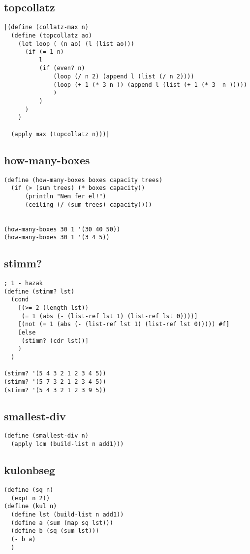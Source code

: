 \begin{multicols}{2}[]

\subsection{topcollatz}
\begin{lstlisting}
|(define (collatz-max n)
  (define (topcollatz ao)
    (let loop ( (n ao) (l (list ao)))
      (if (= 1 n)
          l
          (if (even? n)
              (loop (/ n 2) (append l (list (/ n 2))))
              (loop (+ 1 (* 3 n )) (append l (list (+ 1 (* 3  n )))))
              )
          )
      )
    )

  (apply max (topcollatz n)))|
\end{lstlisting}
\subsection{how-many-boxes}
\begin{lstlisting}
(define (how-many-boxes boxes capacity trees)
  (if (> (sum trees) (* boxes capacity))
      (println "Nem fer el!")
      (ceiling (/ (sum trees) capacity))))


(how-many-boxes 30 1 '(30 40 50))
(how-many-boxes 30 1 '(3 4 5))
\end{lstlisting}

\columnbreak
\subsection{stimm?}
\begin{lstlisting}
; 1 - hazak
(define (stimm? lst)
  (cond
    [(>= 2 (length lst))
     (= 1 (abs (- (list-ref lst 1) (list-ref lst 0))))]
    [(not (= 1 (abs (- (list-ref lst 1) (list-ref lst 0))))) #f]
    [else
     (stimm? (cdr lst))]
    )
  )

(stimm? '(5 4 3 2 1 2 3 4 5))
(stimm? '(5 7 3 2 1 2 3 4 5))
(stimm? '(5 4 3 2 1 2 3 9 5))
\end{lstlisting}

\subsection{smallest-div}
\begin{lstlisting}
(define (smallest-div n)
  (apply lcm (build-list n add1)))
\end{lstlisting}

\subsection{kulonbseg}
\begin{lstlisting}
(define (sq n)
  (expt n 2))
(define (kul n)
  (define lst (build-list n add1))
  (define a (sum (map sq lst)))
  (define b (sq (sum lst)))
  (- b a)
  )
\end{lstlisting}
\end{multicols}
